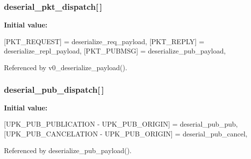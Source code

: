 \subsubsection[{deserial\_\-pkt\_\-dispatch}]{ {\bf deserial\_\-pkt\_\-dispatch}[$\,$]\hspace{0.3cm}{\ttfamily  [static]}}\label{upk__v0__protocol__serializer_8c_a8d51ace6d3825228de0e34cc69f7f306}
{\bfseries Initial value:}
\begin{DoxyCode}
 {
    [PKT_REQUEST] = deserialize_req_payload,
    [PKT_REPLY] = deserialize_repl_payload,
    [PKT_PUBMSG] = deserialize_pub_payload,
}
\end{DoxyCode}


Referenced by v0\_\-deserialize\_\-payload().

\subsubsection[{deserial\_\-pub\_\-dispatch}]{ {\bf deserial\_\-pub\_\-dispatch}[$\,$]\hspace{0.3cm}{\ttfamily  [static]}}\label{upk__v0__protocol__serializer_8c_a22052408dd487a48f772e043dcb9dac7}
{\bfseries Initial value:}
\begin{DoxyCode}
 {
    [UPK_PUB_PUBLICATION - UPK_PUB_ORIGIN] = deserial_pub_pub,
    [UPK_PUB_CANCELATION - UPK_PUB_ORIGIN] = deserial_pub_cancel,
}
\end{DoxyCode}


Referenced by deserialize\_\-pub\_\-payload().

